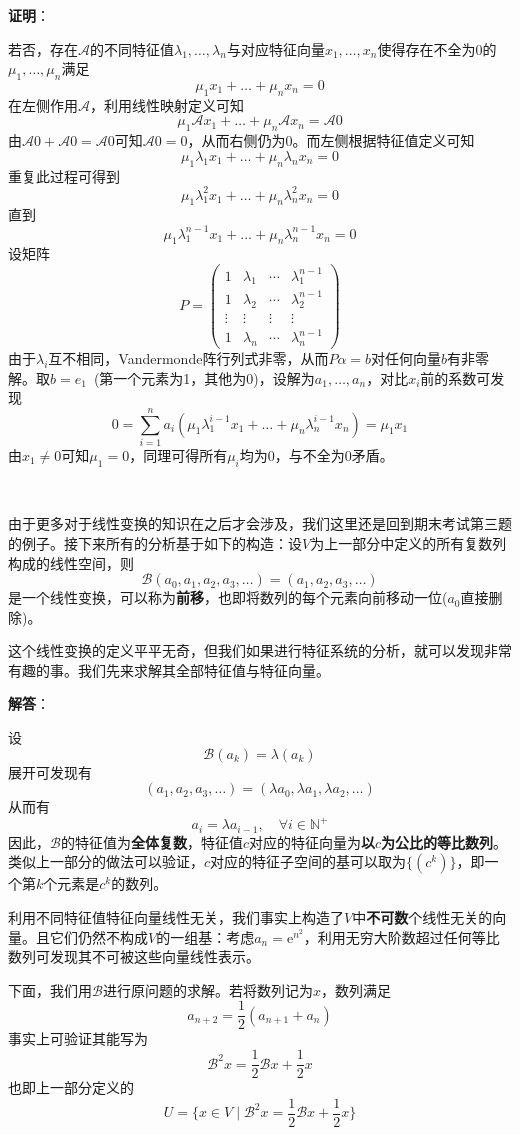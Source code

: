 \documentclass[a4paper,UTF8,fontset=windows,AutoFakeBold]{ctexart}
\newcommand*{\er}{\mathrm{e}}
\newcommand*{\ma}{\mathcal{A}}
\newcommand*{\mb}{\mathcal{B}}
\newcommand*{\note}{\noindent *}
\newcommand{\proo}[1]{{\vspace{5pt}\kaishu\noindent\textbf{证明}：\vspace{-3pt}
\begin{compactitem}
    \item[] #1
\end{compactitem}
}}
\newcommand{\sol}[1]{{\vspace{5pt}\kaishu\noindent\textbf{解答}：\vspace{-3pt}
\begin{compactitem}
    \item[] #1
\end{compactitem}
}}
\begin{document}
\proo{
    若否，存在$\ma$的不同特征值$\lambda_1,\dots,\lambda_n$与对应特征向量$x_1,\dots,x_n$使得存在不全为0的$\mu_1,\dots,\mu_n$满足
    $$\mu_1x_1+\dots+\mu_nx_n=0$$
    在左侧作用$\ma$，利用线性映射定义可知
    $$\mu_1\ma x_1+\dots+\mu_n\ma x_n=\ma0$$
    由$\ma0+\ma0=\ma0$可知$\ma0=0$，从而右侧仍为0。而左侧根据特征值定义可知
    $$\mu_1\lambda_1x_1+\dots+\mu_n\lambda_nx_n=0$$
    重复此过程可得到
    $$\mu_1\lambda_1^2x_1+\dots+\mu_n\lambda_n^2x_n=0$$
    直到
    $$\mu_1\lambda_1^{n-1}x_1+\dots+\mu_n\lambda_n^{n-1}x_n=0$$
    设矩阵
    $$P=\begin{pmatrix}1&\lambda_1&\cdots&\lambda_1^{n-1}\\1&\lambda_2&\cdots&\lambda_2^{n-1}\\\vdots&\vdots&\vdots&\vdots\\1&\lambda_n&\cdots&\lambda_n^{n-1}\end{pmatrix}$$
    由于$\lambda_i$互不相同，Vandermonde阵行列式非零，从而$P\alpha=b$对任何向量$b$有非零解。取$b=e_1$\ (第一个元素为1，其他为0)，设解为$a_1,\dots,a_n$，对比$x_i$前的系数可发现
    $$0=\sum_{i=1}^na_i(\mu_1\lambda_1^{i-1}x_1+\dots+\mu_n\lambda_n^{i-1}x_n)=\mu_1x_1$$
    由$x_1\ne0$可知$\mu_1=0$，同理可得所有$\mu_i$均为0，与不全为0矛盾。
}

\

由于更多对于线性变换的知识在之后才会涉及，我们这里还是回到期末考试第三题的例子。接下来所有的分析基于如下的构造：设$V$为上一部分中定义的所有复数列构成的线性空间，则
$$\mb(a_0,a_1,a_2,a_3,\dots)=(a_1,a_2,a_3,\dots)$$
是一个线性变换，可以称为\textbf{前移}，也即将数列的每个元素向前移动一位($a_0$直接删除)。

这个线性变换的定义平平无奇，但我们如果进行特征系统的分析，就可以发现非常有趣的事。我们先来求解其全部特征值与特征向量。

\sol{
    设
    $$\mb(a_k)=\lambda(a_k)$$
    展开可发现有
    $$(a_1,a_2,a_3,\dots)=(\lambda a_0,\lambda a_1,\lambda a_2,\dots)$$
    从而有
    $$a_i=\lambda a_{i-1},\quad\forall i\in\mathbb{N}^+$$
    因此，$\mb$的特征值为\textbf{全体复数}，特征值$c$对应的特征向量为\textbf{以$c$为公比的等比数列}。类似上一部分的做法可以验证，$c$对应的特征子空间的基可以取为$\{(c^k)\}$，即一个第$k$个元素是$c^k$的数列。
}

\note 利用不同特征值特征向量线性无关，我们事实上构造了$V$中\textbf{不可数}个线性无关的向量。且它们仍然不构成$V$的一组基：考虑$a_n=\er^{n^2}$，利用无穷大阶数超过任何等比数列可发现其不可被这些向量线性表示。

下面，我们用$\mb$进行原问题的求解。若将数列记为$x$，数列满足
$$a_{n+2}=\frac{1}{2}(a_{n+1}+a_n)$$
事实上可验证其能写为
$$\mb^2x=\frac{1}{2}\mb x+\frac{1}{2}x$$
也即上一部分定义的
$$U=\{x\in V\mid\mb^2x=\frac{1}{2}\mb x+\frac{1}{2}x\}$$
\end{document}
